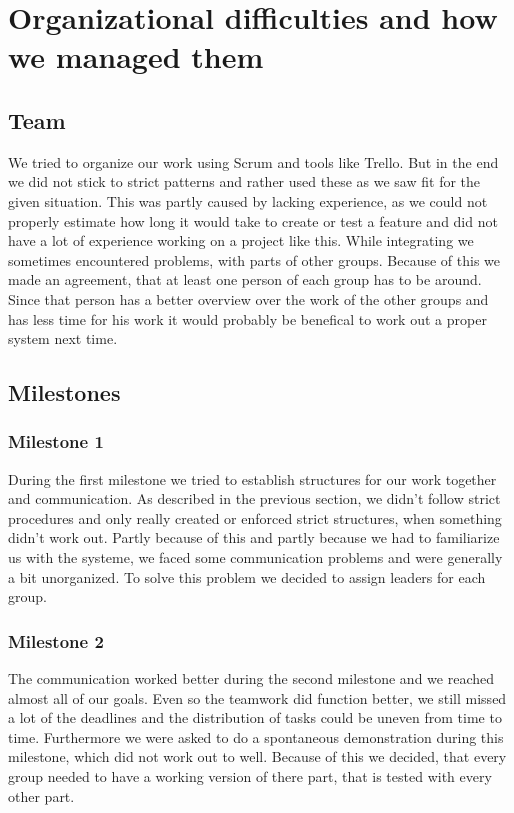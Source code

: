 \documentclass[main.tex]{subfiles}
\begin{document}
	\begingroup

	\renewcommand{\cleardoublepage}{}

	\renewcommand{\clearpage}{}

	\chapter{Organizational difficulties and how we managed them}

		
		\section{Team}
		We tried to organize our work using Scrum and tools like Trello. But in the end we did not stick to strict patterns and rather used these as we saw fit for the given situation. This was partly caused by lacking experience, as we could not properly estimate how long it would take to create or test a feature and did not have a lot of experience working on a project like this.
		While integrating we sometimes encountered problems, with parts of other groups. Because of this we made an agreement, that at least one person of each group has to be around. Since that person has a better overview over the work of the other groups and has less time for his work it would probably be benefical to work out a proper system next time.
		
		
		\section{Milestones}
		
		\subsection{Milestone 1}
		During the first milestone we tried to establish structures for our work together and communication. As described in the previous section, we didn't follow strict procedures and only really created or enforced strict structures, when something didn't work out. Partly because of this and partly because we had to familiarize us with the systeme, we faced some communication problems and were generally a bit unorganized. To solve this problem we decided to assign leaders for each group.
		
		\subsection{Milestone 2}
		The communication worked better during the second milestone and we reached almost all of our goals. Even so the teamwork did function better, we still missed a lot of the deadlines and the distribution of tasks could be uneven from time to time. Furthermore we were asked to do a spontaneous demonstration during this milestone, which did not work out to well. Because of this we decided, that every group needed to have a working version of there part, that is tested with every other part.
		
\end{document}
